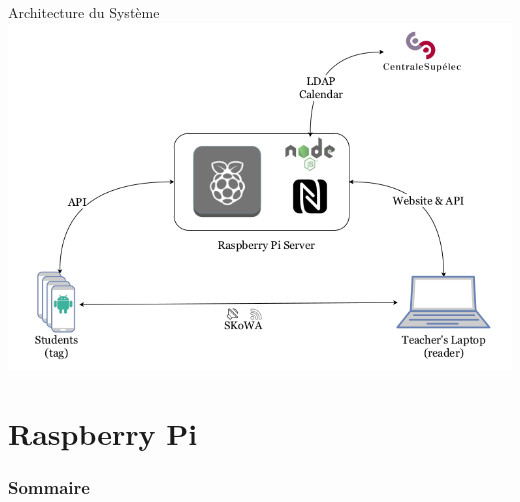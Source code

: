 \documentclass[aspectratio=169]{beamer}
\begin{document}
\begin{frame}{Architecture du Système}
  \centering
  \includegraphics[height=0.8\textheight]{../assets/architecture.png}
\end{frame}


\section{Raspberry Pi}

\begin{frame}
    \frametitle{Sommaire}
    \tableofcontents[
      currentsection,
      sectionstyle=show/shaded,
      subsectionstyle=show/shaded/hide
    ]
\end{frame}
\end{document}
